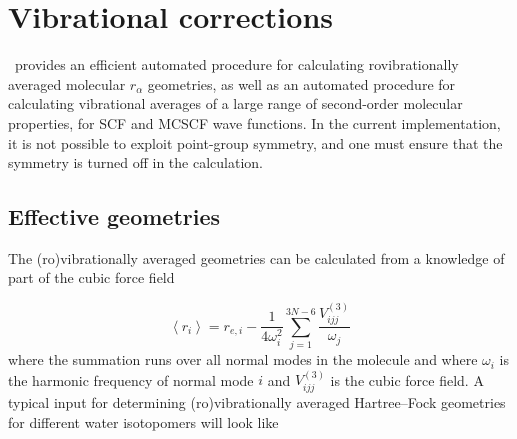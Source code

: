 \chapter{Vibrational corrections}\label{ch:vibave}

\dalton\ provides an efficient automated procedure for calculating
rovibrationally averaged molecular $r_\alpha$ geometries, as well as an
automated procedure for calculating vibrational averages of a large
range of second-order molecular properties, for SCF and MCSCF wave
functions. In the current implementation, it is not possible to
exploit point-group symmetry, and one must ensure that the symmetry is
turned off in the calculation.

\begin{center}
\end{center}

\section{Effective geometries}\label{sec:effgeom}

The (ro)vibrationally averaged geometries can be
calculated from a knowledge of part of the cubic force field

\begin{equation}
\left<r_i\right> = r_{e,i} -
\frac{1}{4\omega_i^2}\sum_{j=1}^{3N-6}\frac{V^{\left(3\right)}_{ijj}}{\omega_j}
\end{equation}
where the summation runs over all normal modes in the molecule and
where $\omega_i$ is the harmonic frequency of normal mode $i$ and
$V^{\left(3\right)}_{ijj}$ is the cubic force field. A typical input
for determining (ro)vibrationally averaged Hartree--Fock geometries
for different water isotopomers will look like

